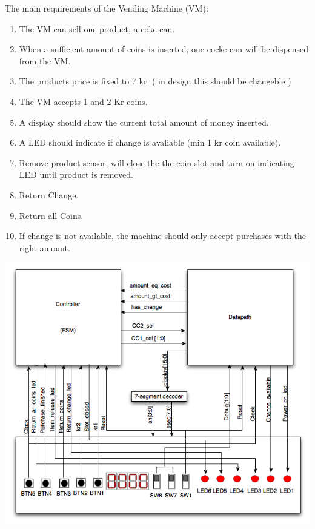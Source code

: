 The main requirements of the Vending Machine (VM):

\begin{enumerate}
\item The VM can sell one product, a coke-can.
\item When a sufficient amount of coins is inserted, one cocke-can will be dispensed from the VM.
\item The products price is fixed to 7 kr. ( in design this should be changeble )
\item The VM accepts 1 and 2 Kr coins.
\item A display should show the current total amount of money inserted.
\item A LED should indicate if change is avaliable (min 1 kr coin available).
\item Remove product sensor, will close the the coin slot and turn on indicating LED until product is removed.
\item Return Change.
\item Return all Coins.
\item If change is not available, the machine should only accept purchases with the right amount.
\end{enumerate}

 \includegraphics[scale=0.75]{fig/SystemDescription.png}
